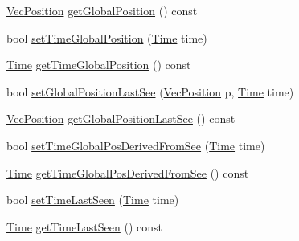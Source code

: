 \begin{DoxyCompactItemize}
\item 
\hyperlink{classVecPosition}{Vec\+Position} \hyperlink{classObject_ac2842396c6a820a0864b767487b465ad}{get\+Global\+Position} () const 
\item 
bool \hyperlink{classObject_a47c32dc89a659bfd381c68ed57917afc}{set\+Time\+Global\+Position} (\hyperlink{classTime}{Time} time)
\item 
\hyperlink{classTime}{Time} \hyperlink{classObject_a599ae480b2d1df43ff83265157a351c1}{get\+Time\+Global\+Position} () const 
\item 
bool \hyperlink{classObject_a65fa38852f3c0ba301dcfa812830c326}{set\+Global\+Position\+Last\+See} (\hyperlink{classVecPosition}{Vec\+Position} p, \hyperlink{classTime}{Time} time)
\item 
\hyperlink{classVecPosition}{Vec\+Position} \hyperlink{classObject_afd7b10a82d0394f1403fc5991a689000}{get\+Global\+Position\+Last\+See} () const 
\item 
bool \hyperlink{classObject_a40b99a05ab37134539b6c52bb95999eb}{set\+Time\+Global\+Pos\+Derived\+From\+See} (\hyperlink{classTime}{Time} time)
\item 
\hyperlink{classTime}{Time} \hyperlink{classObject_abe9fa85b94c18242f856c5c6628077af}{get\+Time\+Global\+Pos\+Derived\+From\+See} () const 
\item 
bool \hyperlink{classObject_a8eedc3dc09c2a67fe6192167f7d2aa60}{set\+Time\+Last\+Seen} (\hyperlink{classTime}{Time} time)
\item 
\hyperlink{classTime}{Time} \hyperlink{classObject_ae2c8eca388d024f1660e203aed3aa35a}{get\+Time\+Last\+Seen} () const 
\end{DoxyCompactItemize}
